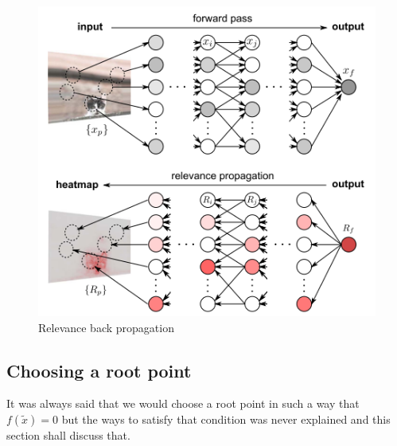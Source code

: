 \documentclass{article}
\begin{document}
	\begin{figure}[H]
		\centering
		\includegraphics[width=0.65\linewidth]{relevance_bp}
		\caption{Relevance back propagation}
		\label{fig:relevance_bp}
	\end{figure}
	
	\subsection{Choosing a root point}
	It was always said that we would choose a root point in such a way that $f(\tilde{x}) = 0$ but the ways to satisfy that condition was never explained and this section shall discuss that.
\end{document}
